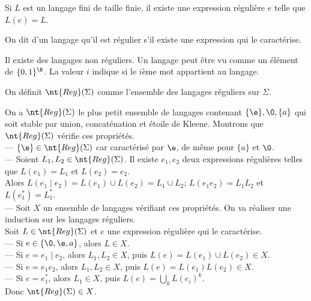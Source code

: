\documentclass[french, 11pt]{article}
\renewcommand*{\S}{\Sigma}
\newcommand*{\Reg}{\nt{Reg}}
\begin{document}
\begin{prop}{}{}
    Si $L$ est un langage fini de taille finie, il existe une expression régulière $e$ telle que $L(e)=L$.
\end{prop}

\begin{defi}{}{}
    On dit d'un langage qu'il est régulier s'il existe une expression qui le caractérise.
\end{defi}

\begin{prop}{}{}
    Il existe des langages non réguliers.
    \tcblower
    Un langage peut être vu comme un élément de $\{0,1\}^\N$. La valeur $i$ indique si le $i$ème mot appartient au langage.
\end{prop}

\begin{defi}{}{}
    On définit $\Reg(\S)$ comme l'ensemble des langages réguliers sur $\S$.
\end{defi}

\begin{prop}{}{}
    On a $\Reg(\S)$ le plus petit ensemble de langages contenant $\{\e\},\0,\{a\}$ qui soit stable par union, concaténation et étoile de Kleene.
    \tcblower
    Montrons que $\Reg(\S)$ vérifie ces propriétés.\\
    --- $\{\e\}\in\Reg(\S)$ car caractérisé par $\e$, de même pour $\{a\}$ et $\0$.\\
    --- Soient $L_1,L_2\in\Reg(\S)$. Il existe $e_1,e_2$ deux expressions régulières telles que $L(e_1)=L_1$ et $L(e_2)=e_2$.\\
    Alors $L(e_1\mid e_2)=L(e_1)\cup L(e_2)=L_1\cup L_2$; $L(e_1e_2)=L_1L_2$ et $L(e_1^*)=L_1^*$.\\
    --- Soit $X$ un ensemble de langages vérifiant ces propriétés. On va réaliser une induction sur les langages réguliers.\\
    Soit $L\in\Reg(\S)$ et $e$ une expression régulière qui le caractérise.\\
    --- Si $e\in\{\0,\e,a\}$, alors $L\in X$.\\
    --- Si $e=e_1\mid e_2$, alors $L_1,L_2\in X$, puis $L(e)=L(e_1)\cup L(e_2)\in X$.\\
    --- Si $e=e_1e_2$, alors $L_1,L_2\in X$, puis $L(e)=L(e_1)L(e_2)\in X$.\\
    --- Si $e=e_1^*$, alors $L_1\in X$, puis $L(e)=\bigcup_k L(e_i)^k$.\\
    Donc $\Reg(\S)\in X$.
\end{prop}
\end{document}
